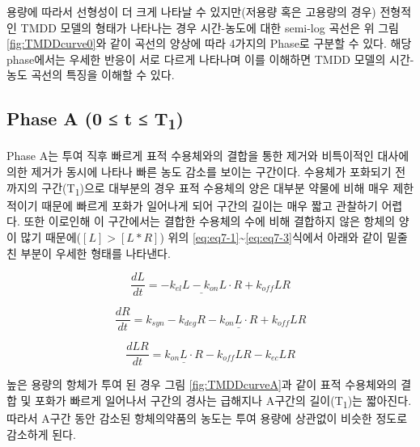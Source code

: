 \documentclass[
  11pt,
  krantz2, a4paper, twoside]{krantz}
\theoremstyle{definition}
\theoremstyle{definition}
\theoremstyle{definition}
\theoremstyle{definition}
\theoremstyle{remark}
\begin{document}
용량에 따라서 선형성이 더 크게 나타날 수 있지만(저용량 혹은 고용량의 경우) 전형적인 TMDD 모델의 형태가 나타나는 경우 시간-농도에 대한 semi-log 곡선은 위 그림\ref{fig:TMDDcurve0}와 같이 곡선의 양상에 따라 4가지의 Phase로 구분할 수 있다. 해당 phase에서는 우세한 반응이 서로 다르게 나타나며 이를 이해하면 TMDD 모델의 시간-농도 곡선의 특징을 이해할 수 있다.

\subsection{\texorpdfstring{Phase A (0 ≤ t ≤ T\textsubscript{1})}{Phase A (0 ≤ t ≤ T1)}}\label{phase-a-0-t-t1}

Phase A는 투여 직후 빠르게 표적 수용체와의 결합을 통한 제거와 비특이적인 대사에 의한 제거가 동시에 나타나 빠른 농도 감소를 보이는 구간이다. 수용체가 포화되기 전까지의 구간(T\textsubscript{1})으로 대부분의 경우 표적 수용체의 양은 대부분 약물에 비해 매우 제한적이기 때문에 빠르게 포화가 일어나게 되어 구간의 길이는 매우 짧고 관찰하기 어렵다. 또한 이로인해 이 구간에서는 결합한 수용체의 수에 비해 결합하지 않은 항체의 양이 많기 때문에(\([L] > [L*R]\)) 위의 \eqref{eq:eq7-1}\textasciitilde\eqref{eq:eq7-3}식에서 아래와 같이 밑줄 친 부분이 우세한 형태를 나타낸다.

\begin{equation}
\frac{dL}{dt} = \underline {-k_{el}L - k_{on}L \cdot R} + k_{off}LR
\label{eq:eq7-6}
\end{equation}

\begin{equation}
\frac{dR}{dt} = k_{syn} - k_{deg}R - \underline{k_{on}L \cdot R} + k_{off}LR
\label{eq:eq7-7}
\end{equation}

\begin{equation}
\frac{dLR}{dt} = \underline {k_{on}L \cdot R} - k_{off}LR - k_{ec}LR
\label{eq:eq7-8}
\end{equation}

높은 용량의 항체가 투여 된 경우 그림 \ref{fig:TMDDcurveA}과 같이 표적 수용체와의 결합 및 포화가 빠르게 일어나서 구간의 경사는 급해지나 A구간의 길이(T\textsubscript{1})는 짧아진다. 따라서 A구간 동안 감소된 항체의약품의 농도는 투여 용량에 상관없이 비슷한 정도로 감소하게 된다.
\end{document}
